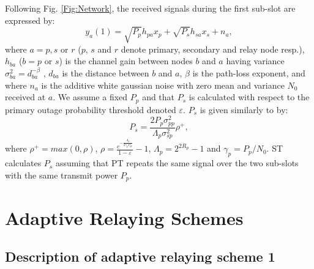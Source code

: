 \documentclass[conference,twocolumn]{IEEEtran}
\begin{document}
Following Fig. \ref{Fig:Network}, the received signals during the first sub-slot are expressed
by:
\begin{equation}
\label{eq:received_PD_direct}
y_{a}(1)=\sqrt{P_{p}}h_{pa}x_p+\sqrt{P_{s}}h_{sa}x_s+n_{a},
\end{equation}
where $a=p,s$ or $r$ ($p$, $s$ and $r$ denote primary, secondary
and relay node resp.), $h_{ba}$ ($b=p$ or $s$) is the channel gain between nodes $b$ and $a$ having variance $\sigma_{ba}^{2}=d_{ba}^{-\beta}$ , $d_{ba}$ is the distance between $b$ and $a$, $\beta$ is the path-loss exponent, and where $n_{a}$ is the
additive white gaussian noise with zero mean and variance
$N_0$ received at $a$. We assume a fixed $P_p$ and that $P_s$ is calculated with respect to the
primary outage probability threshold denoted $\varepsilon$.  $P_s$ is
given similarly to \cite{Zou} by:
\begin{equation}
\label{eq:condition_gamma_ST}
P_s=\frac{2 P_p \sigma_{pp}^{2}}{\Lambda_p \sigma_{sp}^{2}} \rho^{+},
\end{equation}
where $\rho^{+}=max(0,\rho)$, $\rho=\frac{e^{-\frac{\Lambda_p}{2
{\gamma}_{p}\sigma_{pp}^{2}}}}{1-\varepsilon}-1$, $\Lambda_p=2^{2 R_p}-1$ and $\gamma_p = P_p/N_0$. ST calculates $P_s$ assuming that PT repeats the same signal over the two sub-slots with the same transmit power $P_p$.

\section{Adaptive Relaying Schemes}

\subsection{Description of adaptive relaying scheme 1}
\end{document}
